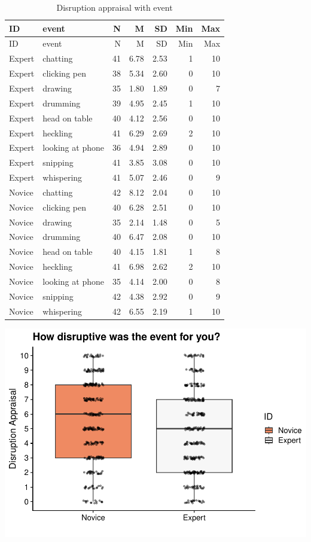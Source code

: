 \documentclass[
]{article}
\begin{document}
\begin{longtable}[]{@{}llrrrrr@{}}
\caption{Disruption appraisal with event}\tabularnewline
\toprule\noalign{}
ID & event & N & M & SD & Min & Max \\
\midrule\noalign{}
\endfirsthead
\toprule\noalign{}
ID & event & N & M & SD & Min & Max \\
\midrule\noalign{}
\endhead
\bottomrule\noalign{}
\endlastfoot
Expert & chatting & 41 & 6.78 & 2.53 & 1 & 10 \\
Expert & clicking pen & 38 & 5.34 & 2.60 & 0 & 10 \\
Expert & drawing & 35 & 1.80 & 1.89 & 0 & 7 \\
Expert & drumming & 39 & 4.95 & 2.45 & 1 & 10 \\
Expert & head on table & 40 & 4.12 & 2.56 & 0 & 10 \\
Expert & heckling & 41 & 6.29 & 2.69 & 2 & 10 \\
Expert & looking at phone & 36 & 4.94 & 2.89 & 0 & 10 \\
Expert & snipping & 41 & 3.85 & 3.08 & 0 & 10 \\
Expert & whispering & 41 & 5.07 & 2.46 & 0 & 9 \\
Novice & chatting & 42 & 8.12 & 2.04 & 0 & 10 \\
Novice & clicking pen & 40 & 6.28 & 2.51 & 0 & 10 \\
Novice & drawing & 35 & 2.14 & 1.48 & 0 & 5 \\
Novice & drumming & 40 & 6.47 & 2.08 & 0 & 10 \\
Novice & head on table & 40 & 4.15 & 1.81 & 1 & 8 \\
Novice & heckling & 41 & 6.98 & 2.62 & 2 & 10 \\
Novice & looking at phone & 35 & 4.14 & 2.00 & 0 & 8 \\
Novice & snipping & 42 & 4.38 & 2.92 & 0 & 9 \\
Novice & whispering & 42 & 6.55 & 2.19 & 1 & 10 \\
\end{longtable}

\includegraphics{expertise_2024_09_26_no_outlierdetection_MK_files/figure-latex/rating_scales-1.pdf}
\end{document}
